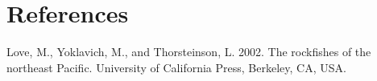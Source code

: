 \documentclass[12pt,]{article}
\begin{document}
\newpage

\thispagestyle{empty}

\section*{References}\label{references}

Love, M., Yoklavich, M., and Thorsteinson, L. 2002. The rockfishes of
the northeast Pacific. University of California Press, Berkeley, CA,
USA.
\end{document}
